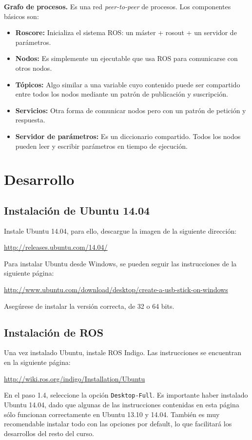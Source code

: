 \documentclass[letterpaper,12pt]{article}
\begin{document}
\textbf{Grafo de procesos.} Es una red \textit{peer-to-peer} de procesos. Los componentes básicos son:
\begin{itemize}
\item \textbf{Roscore:} Inicializa el sistema ROS: un máster + rosout + un servidor de parámetros.
\item \textbf{Nodos:} Es simplemente un ejecutable que usa ROS para comunicarse con otros nodos.
\item \textbf{Tópicos:} Algo similar a una variable cuyo contenido puede ser compartido entre todos los nodos mediante un patrón de publicación y suscripción. 
\item \textbf{Servicios:} Otra forma de comunicar nodos pero con un patrón de petición y respuesta.
\item \textbf{Servidor de parámetros:} Es un diccionario compartido. Todos los nodos pueden leer y escribir parámetros en tiempo de ejecución.
\end{itemize}

\section{Desarrollo}
\subsection{Instalación de Ubuntu 14.04}
Instale Ubuntu 14.04, para ello, descargue la imagen de la siguiente dirección:

\url{http://releases.ubuntu.com/14.04/}

Para instalar Ubuntu desde Windows, se pueden seguir las instrucciones de la siguiente página:

\url{http://www.ubuntu.com/download/desktop/create-a-usb-stick-on-windows}

Asegúrese de instalar la versión correcta, de 32 o 64 bits. 

\subsection{Instalación de ROS}

Una vez instalado Ubuntu, instale ROS Indigo. Las instrucciones se encuentran en la siguiente página:

\url{http://wiki.ros.org/indigo/Installation/Ubuntu}

En el paso 1.4, seleccione la opción \texttt{Desktop-Full}. Es importante haber instalado Ubuntu 14.04, dado que algunas de las instrucciones contenidas en esta página sólo funcionan correctamente en Ubuntu 13.10 y 14.04. También es muy recomendable instalar todo con las opciones por default, lo que facilitará los desarrollos del resto del curso. 
\end{document}
